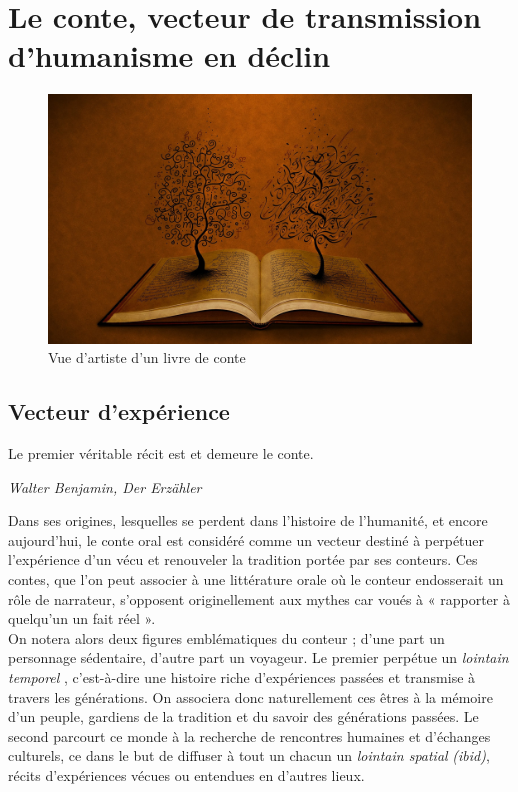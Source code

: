 \section{Le conte, vecteur de transmission d'humanisme en déclin}

\begin{figure}[h!]
    \centering
    \includegraphics[width=0.80\linewidth]{img/tale_book.jpg}
    \caption{Vue d'artiste d'un livre de conte}
\end{figure}

\subsection{Vecteur d'expérience}
\begin{shadequote}
Le premier véritable récit est et demeure le conte. \par\emph{Walter Benjamin, Der Erzähler}
\end{shadequote}

Dans ses origines, lesquelles se perdent dans l'histoire de l'humanité, et encore aujourd'hui, le conte oral est considéré comme un vecteur destiné à perpétuer l'expérience d'un vécu et renouveler la tradition portée par ses conteurs. Ces contes, que l'on peut associer à une littérature orale où le conteur endosserait un rôle de narrateur, s'opposent originellement aux mythes car voués à « rapporter à quelqu'un un fait réel »\cite{cnrtl}.\\

On notera alors deux figures emblématiques du conteur ; d'une part un personnage sédentaire, d'autre part un voyageur. Le premier perpétue un \textit{lointain temporel} \cite{nouss2003conteur}, c'est-à-dire une histoire riche d'expériences passées et transmise à travers les générations. On associera donc naturellement ces êtres à la mémoire d'un peuple, gardiens de la tradition et du savoir des générations passées. Le second parcourt ce monde à la recherche de rencontres humaines et d'échanges culturels, ce dans le but de diffuser à tout un chacun un \textit{lointain spatial} \textit{(ibid)}, récits d'expériences vécues ou entendues en d'autres lieux.\\

